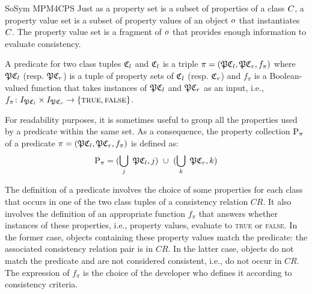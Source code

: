 \begin{copiedFrom}{SoSym MPM4CPS}
Just as a property set is a subset of properties of a class $C_{}$, a property value set is a subset of property values of an object $o_{}$ that instantiates $C_{}$. The property value set is a fragment of $o_{}$ that provides enough information to evaluate consistency.

\begin{definition}[Predicate]
A predicate for two class tuples $\mathfrak{C}_{l}$ and $\mathfrak{C}_{l}$ is a triple $\pi = (\mathfrak{P}{\mathfrak{C}_{l}}, \mathfrak{P}{\mathfrak{C}_{r}}, f_\pi)$ where $\mathfrak{P}{\mathfrak{C}_{l}}$ (resp. $\mathfrak{P}{\mathfrak{C}_{r}}$) is a tuple of property sets of $\mathfrak{C}_{l}$ (resp. $\mathfrak{C}_{r}$) and $f_\pi$ is a Boolean-valued function that takes instances of $\mathfrak{P}{\mathfrak{C}_{l}}$ and $\mathfrak{P}{\mathfrak{C}_{r}}$ as an input, i.e., $f_\pi \colon I_{\mathfrak{P}{\mathfrak{C}_{l}}} \times I_{\mathfrak{P}{\mathfrak{C}_{r}}} \to \{\textsc{true}, \textsc{false}\}$.
\end{definition}

For readability purposes, it is sometimes useful to group all the properties used by a predicate within the same set. As a consequence, the property collection $\mathrm{P}_{\pi}$ of a predicate $\pi = (\mathfrak{P}{\mathfrak{C}_{l}}, \mathfrak{P}{\mathfrak{C}_{r}}, f_\pi)$ is defined as:
\begin{align*}
    \formulaskip &
    \propertycollection{\pi} = (\bigcup_{j}\ \tuple{P}{\classtuple{C}{l}, j})\ \cup\ (\bigcup_{k}\ \tuple{P}{\classtuple{C}{r}, k})  
\end{align*}

The definition of a predicate involves the choice of some properties for each class that occurs in one of the two class tuples of a consistency relation $CR$. It also involves the definition of an appropriate function $f_\pi$ that answers whether instances of these properties, i.e., property values, evaluate to \textsc{true} or \textsc{false}. In the former case, objects containing these property values match the predicate: the associated consistency relation pair is in $CR$. In the latter case, objects do not match the predicate and are not considered consistent, i.e., do not occur in $CR$. The expression of $f_\pi$ is the choice of the developer who defines it according to consistency criteria.


\end{copiedFrom}
